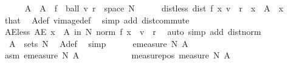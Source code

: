 \begin{isabellebody}
\ \ \ \ \isamarkupfalse%
\ A\ \ {\isachardoublequoteopen}A\ {\isacharequal}{\kern0pt}\ f\ {\isacharminus}{\kern0pt}{\isacharbackquote}{\kern0pt}\ ball\ v\ r\ {\isasyminter}\ space\ N{\isachardoublequoteclose}\isanewline
\ \ \ \ \isamarkupfalse%
\ dist{\isacharunderscore}{\kern0pt}less{\isacharcolon}{\kern0pt}\ {\isachardoublequoteopen}dist\ {\isacharparenleft}{\kern0pt}f\ x{\isacharparenright}{\kern0pt}\ v\ {\isacharless}{\kern0pt}\ r{\isachardoublequoteclose}\ \ {\isachardoublequoteopen}x\ {\isasymin}\ A{\isachardoublequoteclose}\ \ x\ \isamarkupfalse%
\ that\ \isamarkupfalse%
\ A{\isacharunderscore}{\kern0pt}def\ vimage{\isacharunderscore}{\kern0pt}def\ \isamarkupfalse%
\ {\isacharparenleft}{\kern0pt}simp\ add{\isacharcolon}{\kern0pt}\ dist{\isacharunderscore}{\kern0pt}commute{\isacharparenright}{\kern0pt}\isanewline
\ \ \ \ \isamarkupfalse%
\ AE{\isacharunderscore}{\kern0pt}less{\isacharcolon}{\kern0pt}\ {\isachardoublequoteopen}AE\ x\ {\isasymin}\ A\ in\ N{\isachardot}{\kern0pt}\ norm\ {\isacharparenleft}{\kern0pt}f\ x\ {\isacharminus}{\kern0pt}\ v{\isacharparenright}{\kern0pt}\ {\isacharless}{\kern0pt}\ r{\isachardoublequoteclose}\ \isamarkupfalse%
\ {\isacharparenleft}{\kern0pt}auto\ simp\ add{\isacharcolon}{\kern0pt}\ dist{\isacharunderscore}{\kern0pt}norm{\isacharparenright}{\kern0pt}\isanewline
\ \ \ \ \isamarkupfalse%
\ {\isacharasterisk}{\kern0pt}{\isacharcolon}{\kern0pt}\ {\isachardoublequoteopen}A\ {\isasymin}\ sets\ N{\isachardoublequoteclose}\ \isamarkupfalse%
\ A{\isacharunderscore}{\kern0pt}def\ \isamarkupfalse%
\ simp\isanewline
\ \ \ \ \isamarkupfalse%
\ {\isachardoublequoteopen}emeasure\ N\ A\ {\isacharequal}{\kern0pt}\ {}{\isachardoublequoteclose}\ \isanewline
\ \ \ \ \isamarkupfalse%
\ {\isacharminus}{\kern0pt}\isanewline
\ \ \ \ \ \ \isacommand{{\isacharbraceleft}{\kern0pt}}\isamarkupfalse%
\isanewline
\ \ \ \ \ \ \ \ \isamarkupfalse%
\ asm{\isacharcolon}{\kern0pt}\ {\isachardoublequoteopen}emeasure\ N\ A\ {\isachargreater}{\kern0pt}\ {}{\isachardoublequoteclose}\isanewline
\ \ \ \ \ \ \ \ \isamarkupfalse%
\ measure{\isacharunderscore}{\kern0pt}pos{\isacharcolon}{\kern0pt}\ {\isachardoublequoteopen}measure\ N\ A\ {\isachargreater}{\kern0pt}\ {}{\isachardoublequoteclose}\ \isamarkupfalse%

\end{isabellebody}
